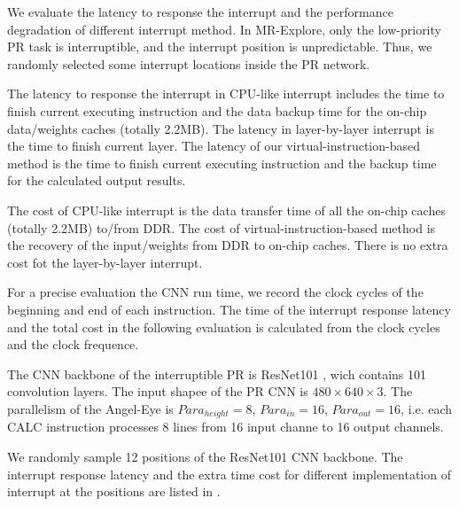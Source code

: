 We evaluate the latency to response the interrupt and the performance degradation of different interrupt method. In MR-Explore, only the low-priority PR task is interruptible, and the interrupt position is unpredictable. Thus, we randomly selected some interrupt locations inside the PR network.

The latency to response the interrupt in CPU-like interrupt includes the time to finish current executing instruction and the data backup time for the on-chip data/weights caches (totally 2.2MB). The latency in layer-by-layer interrupt is the time to finish current layer. The latency of our virtual-instruction-based method is the time to finish current executing instruction and the backup time for the calculated output results. 

The cost of CPU-like interrupt is the data transfer time of all the on-chip caches (totally 2.2MB) to/from DDR. The cost of virtual-instruction-based method is the recovery of the input/weights from DDR to on-chip caches. There is no extra cost fot the layer-by-layer interrupt.

For a precise evaluation the CNN run time, we record the clock cycles of the beginning and end of each instruction. The time of the interrupt response latency and the total cost in the following evaluation is calculated from the clock cycles and the clock frequence.

The CNN backbone of the interruptible PR is ResNet101 \cite{he2016deep}, wich contains 101 convolution layers. The input shapee of the PR CNN is $480 \times 640 \times 3$. The parallelism of the Angel-Eye is $Para_{height}=8$, $Para_{in}=16$, $Para_{out}=16$, i.e. each CALC instruction processes 8 lines from 16 input channe to 16 output channels. 

We randomly sample 12 positions of the ResNet101 CNN backbone. The interrupt response latency and the extra time cost for different implementation of interrupt at the positions are listed in .




